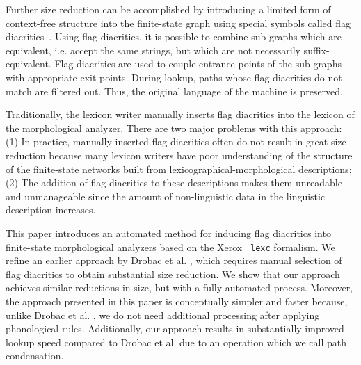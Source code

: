 \documentclass[11pt]{article}
\begin{document}

Further size reduction can be accomplished by introducing a limited
form of context-free structure into the finite-state graph using
special symbols called flag
diacritics~\cite{beesley1998constraining}. Using flag diacritics, it
is possible to combine sub-graphs which are equivalent, i.e. accept
the same strings, but which are not necessarily
suffix-equivalent. Flag diacritics are used to couple entrance points
of the sub-graphs with appropriate exit points. During lookup, paths
whose flag diacritics do not match are filtered out. Thus, the
original language of the machine is preserved.

Traditionally, the lexicon writer manually inserts flag diacritics
into the lexicon of the morphological analyzer. There are two major
problems with this approach: (1) In practice, manually inserted flag
diacritics often do not result in great size reduction because many
lexicon writers have poor understanding of the structure
of the finite-state networks built from lexicographical-morphological
descriptions; (2) The addition of flag diacritics to these
descriptions makes them unreadable and unmanageable since the amount
of non-linguistic data in the linguistic description increases.


This paper introduces an automated method for inducing flag diacritics
into finite-state morphological analyzers based on the Xerox {\tt
  lexc} formalism.  We refine an earlier approach by Drobac et
al. , which requires manual selection of flag
diacritics to obtain substantial size reduction. We show that
our approach achieves similar reductions in size, but with a fully
automated process. Moreover, the approach presented in this paper is
conceptually simpler and faster because, unlike Drobac et
al. , we do not need additional processing after
applying phonological rules. Additionally, our approach results in
substantially improved lookup speed compared to Drobac et
al.  due to an operation which we call path
condensation.
\end{document}
